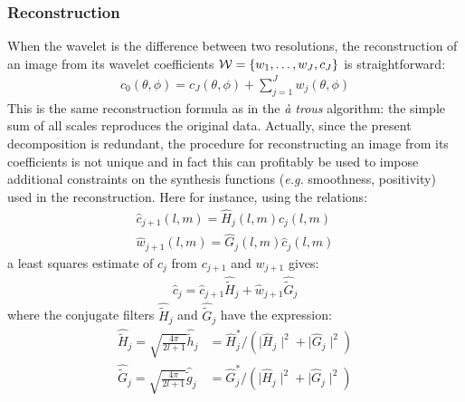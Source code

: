 \subsubsection*{Reconstruction}
When the wavelet is the difference between two resolutions, the reconstruction of an image from its wavelet coefficients ${\cal W} = \{w_1,\dots, w_{J}, c_{J}\}$ is straightforward: 
\begin{eqnarray}
 c_{0}(\theta, \phi) = c_{J}(\theta, \phi) + \sum_{j=1}^J  w_j(\theta, \phi)
\end{eqnarray}
This is the same reconstruction formula as in the \emph{\`a trous} algorithm: the simple sum of all scales reproduces the original data. 
Actually, since the present decomposition is redundant, the procedure for reconstructing an image from its coefficients is not unique and 
in fact this can profitably be used to impose additional constraints on the synthesis functions (\emph{e.g.} smoothness, positivity) used 
in the reconstruction. Here for instance, using the relations:
\begin{eqnarray}
\hat c_{j+1}(l,m) = \widehat H_{j} (l,m)  \hat c_{j} (l,m) \nonumber \\
\hat w_{j+1}(l,m) = \widehat G_{j} (l,m) \hat c_{j} (l,m) 
\end{eqnarray}
a least squares estimate of $c_j$ from $c_{j+1}$ and $w_{j+1}$ gives:
\begin{eqnarray}
\hat{c}_{j}   = \hat{c}_{j+1}  {\widehat {\tilde H}}_{j}   + \hat{w}_{j+1}  {\widehat {\tilde G}}_{j} 
\end{eqnarray}
where the conjugate filters $ {\widehat {\tilde H}}_j $ and $ {\widehat {\tilde G}}_j$ have the expression:
\begin{eqnarray}
 {\widehat {\tilde H}}_j =  \sqrt{\frac{4\pi}{2l+1} } {\hat {\tilde h}}_j & = {\widehat H}_{j}^* /
(\mid {\widehat H}_{j}\mid^2 + \mid {\widehat G}_j\mid^2) \label{eqnht} \\ 
 {\widehat {\tilde G}}_j =  \sqrt{\frac{4\pi}{2l+1} } {\hat {\tilde g}}_j & = {\widehat G}_{j}^* /
(\mid {\widehat H}_j \mid^2 + \mid {\widehat G}_j \mid^2)
\label{eqngt}
\end{eqnarray}
